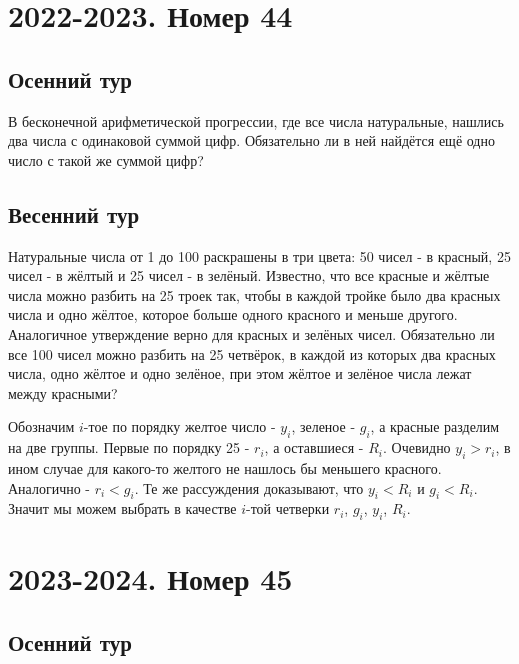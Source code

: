 \documentclass[11pt, a4paper]{common/document_template}
\begin{document}
\chapter{2022-2023. Номер 44}

\section{Осенний тур}

\begin{exercise}
В бесконечной арифметической прогрессии, где все числа натуральные, нашлись два числа с одинаковой суммой цифр. Обязательно ли в ней найдётся ещё одно число с такой же суммой цифр?
\end{exercise}

\section{Весенний тур}

\begin{exercise}
Натуральные числа от 1 до 100 раскрашены в три цвета: 50 чисел - в красный, 25
чисел - в жёлтый и 25 чисел - в зелёный. Известно, что все красные и жёлтые числа можно разбить на 25 троек так, чтобы в каждой тройке было два красных числа и одно жёлтое, которое больше одного красного и меньше другого. Аналогичное утверждение верно для красных и зелёных чисел. Обязательно ли все 100 чисел можно разбить на 25 четвёрок, в каждой из которых два красных числа, одно жёлтое и одно зелёное, при этом жёлтое и зелёное числа лежат между красными?
\end{exercise}

\begin{Solution}
Обозначим $i$-тое по порядку желтое число - $y_{i}$, зеленое - $g_{i}$, а красные разделим на две группы. Первые по порядку 25 - $r_{i}$, а оставшиеся - $R_{i}$. Очевидно $y_{i} > r_{i}$, в ином случае для какого-то желтого не нашлось бы меньшего красного. Аналогично - $r_{i} < g_{i}$. Те же рассуждения доказывают, что $y_{i} < R_{i}$ и $g_{i} < R_{i}$. Значит мы можем выбрать в качестве $i$-той четверки $r_{i}$, $g_{i}$, $y_{i}$, $R_{i}$.
\end{Solution}

\chapter{2023-2024. Номер 45}

\section{Осенний тур}
\end{document}
